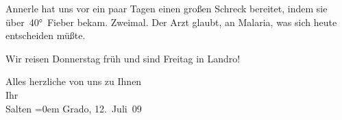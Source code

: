 \pstart
           Annerle hat uns vor ein paar Tagen einen
               großen Schreck bereitet, indem sie über 40° Fieber bekam. Zweimal. Der Arzt glaubt, an Malaria, was
               sich heute entscheiden müßte.\pend
           
\pstart
           Wir reisen Donnerstag{ }früh und sind Freitag in Landro!\pend
           
\pstart
           Alles herzliche von uns zu Ihnen {\\[\baselineskip]}Ihr {\\[\baselineskip]}\spacefill\mbox{Salten}\pend
           \leftskip=0em{}
\pstart
           Grado, 12. Juli 09\pend
           \endnumbering{}  \newcommand{\dateiname}{L03502}\newcommand{\titel}{Felix Salten an Arthur Schnitzler, 12. 7. 1909}\newcommand{\editorInnen}{Martin Anton Müller und Laura Untner}

